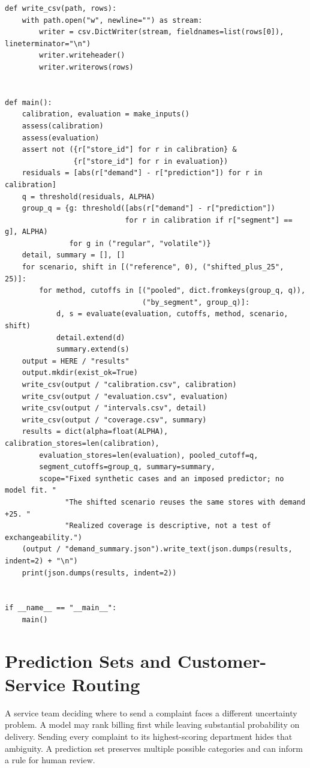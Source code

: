 \begin{Verbatim}[breaklines,breakanywhere,fontsize=\small]
def write_csv(path, rows):
    with path.open("w", newline="") as stream:
        writer = csv.DictWriter(stream, fieldnames=list(rows[0]), lineterminator="\n")
        writer.writeheader()
        writer.writerows(rows)


def main():
    calibration, evaluation = make_inputs()
    assess(calibration)
    assess(evaluation)
    assert not ({r["store_id"] for r in calibration} &
                {r["store_id"] for r in evaluation})
    residuals = [abs(r["demand"] - r["prediction"]) for r in calibration]
    q = threshold(residuals, ALPHA)
    group_q = {g: threshold([abs(r["demand"] - r["prediction"])
                            for r in calibration if r["segment"] == g], ALPHA)
               for g in ("regular", "volatile")}
    detail, summary = [], []
    for scenario, shift in [("reference", 0), ("shifted_plus_25", 25)]:
        for method, cutoffs in [("pooled", dict.fromkeys(group_q, q)),
                                ("by_segment", group_q)]:
            d, s = evaluate(evaluation, cutoffs, method, scenario, shift)
            detail.extend(d)
            summary.extend(s)
    output = HERE / "results"
    output.mkdir(exist_ok=True)
    write_csv(output / "calibration.csv", calibration)
    write_csv(output / "evaluation.csv", evaluation)
    write_csv(output / "intervals.csv", detail)
    write_csv(output / "coverage.csv", summary)
    results = dict(alpha=float(ALPHA), calibration_stores=len(calibration),
        evaluation_stores=len(evaluation), pooled_cutoff=q,
        segment_cutoffs=group_q, summary=summary,
        scope="Fixed synthetic cases and an imposed predictor; no model fit. "
              "The shifted scenario reuses the same stores with demand +25. "
              "Realized coverage is descriptive, not a test of exchangeability.")
    (output / "demand_summary.json").write_text(json.dumps(results, indent=2) + "\n")
    print(json.dumps(results, indent=2))


if __name__ == "__main__":
    main()
\end{Verbatim}

\hypertarget{M07-prediction-sets-and-customer-service-routing}{%
\section{Prediction Sets and Customer-Service
Routing}\label{M07-prediction-sets-and-customer-service-routing}}

\noindent \noindent A service team deciding where to send a complaint faces a
different uncertainty problem. A model may rank billing first while
leaving substantial probability on delivery. Sending every complaint to
its highest-scoring department hides that ambiguity. A prediction set
preserves multiple possible categories and can inform a rule for human
review.

